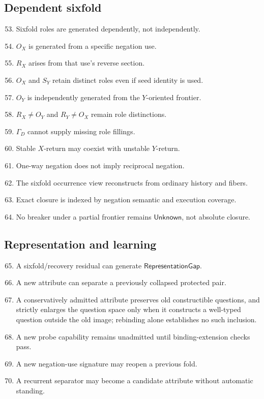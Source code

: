 \documentclass[11pt,oneside]{article}
\begin{document}
\subsection{Dependent sixfold}
\begin{enumerate}\setcounter{enumi}{52}
\item Sixfold roles are generated dependently, not independently.
\item \(O_X\) is generated from a specific negation use.
\item \(R_X\) arises from that use's reverse section.
\item \(O_X\) and \(S_Y\) retain distinct roles even if seed identity is used.
\item \(O_Y\) is independently generated from the \(Y\)-oriented frontier.
\item \(R_X\neq O_Y\) and \(R_Y\neq O_X\) remain role distinctions.
\item \(\Gamma_D\) cannot supply missing role fillings.
\item Stable \(X\)-return may coexist with unstable \(Y\)-return.
\item One-way negation does not imply reciprocal negation.
\item The sixfold occurrence view reconstructs from ordinary history and fibers.
\item Exact closure is indexed by negation semantic and execution coverage.
\item No breaker under a partial frontier remains \(\mathsf{Unknown}\), not absolute closure.
\end{enumerate}

\subsection{Representation and learning}
\begin{enumerate}\setcounter{enumi}{64}
\item A sixfold/recovery residual can generate \(\mathsf{RepresentationGap}\).
\item A new attribute can separate a previously collapsed protected pair.
\item A conservatively admitted attribute preserves old constructible questions, and
strictly enlarges the question space only when it constructs a well-typed question
outside the old image; rebinding alone establishes no such inclusion.
\item A new probe capability remains unadmitted until binding-extension checks pass.
\item A new negation-use signature may reopen a previous fold.
\item A recurrent separator may become a candidate attribute without automatic standing.
\end{enumerate}
\end{document}
